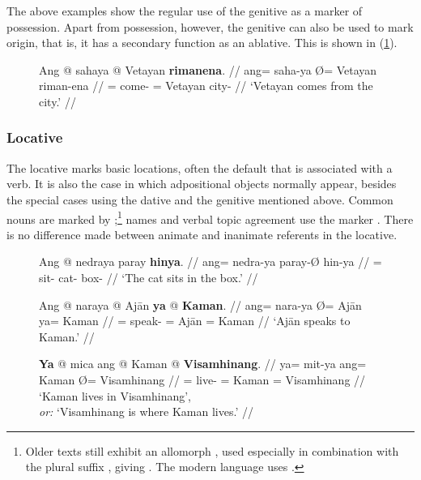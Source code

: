 The above examples show the regular use of the genitive as a marker of
possession. Apart from possession, however, the genitive can also be used to
mark origin, that is, it has a secondary function as an ablative. This is shown
in (\ref{ex:genabl}).

\begin{figure}[h]
\ex\label{ex:genabl}%
\begingl
	\gla Ang @ sahaya {} @ Vetayan \textbf{rimanena}. //
	\glb ang= saha-ya Ø= Vetayan riman-ena //
	\glc \AgtT{}= come-\TsgM{} \Top{}= Vetayan city-\Gen{} //
	\glft `Vetayan comes from the city.' //
\endgl
\xe
\end{figure}


\subsubsection{Locative}

The locative marks basic locations, often the default that is associated with a
verb. It is also the case in which adpositional objects normally appear,
besides the special cases using the dative and the genitive mentioned above.
Common nouns are marked by ;\footnote{Older texts still exhibit
an allomorph , used especially in combination with the plural
suffix , giving . The modern language uses
.} names and verbal topic agreement use the marker 
. There is no difference made between animate and inanimate 
referents in the locative.

\begin{figure}
\pex\label{ex:locplain}
\a\label{ex:locnedra}\begingl
	\gla Ang @ nedraya paray \textbf{hinya}. //
	\glb ang= nedra-ya paray-Ø hin-ya //
	\glc \AgtT{}= sit-\TsgM{} cat-\Top{} box-\Loc{} //
	\glft `The cat sits in the box.' //
\endgl

\a\label{ex:locnara}\begingl
	\gla Ang @ naraya {} @ Ajān \textbf{ya} @ \textbf{Kaman}. //
	\glb ang= nara-ya Ø= Ajān ya= Kaman //
	\glc \AgtT{}= speak-\TsgM{} \Top{}= Ajān \Loc{}= Kaman //
	\glft `Ajān speaks to Kaman.' //
\endgl

\a\label{ex:locmit}\begingl
	\gla \textbf{Ya} @ mica ang @ Kaman {} @ \textbf{Visamhinang}. //
	\glb ya= mit-ya ang= Kaman Ø= Visamhinang //
	\glc \LocT{}= live-\TsgM{} \Aarg{}= Kaman \Top{}= Visamhinang //
	\glft `Kaman lives in Visamhinang',\\
		\textit{or:} `Visamhinang is where Kaman lives.' //
\endgl
\xe
\end{figure}

